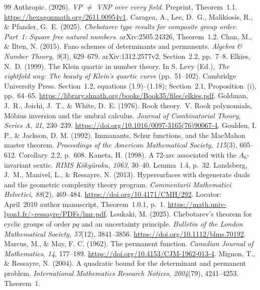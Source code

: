 \documentclass[11pt]{article}
\theoremstyle{definition}
\theoremstyle{remark}
\begin{document}
\begin{thebibliography}{99}
 Anthropic. (2026). \emph{VP $\ne$ VNP over every field}. Preprint, Theorem~1.1. \url{https://hexagonmath.org/2611.00954v1}.
 Caragea, A., Lee, D.~G., Malikiosis, R., \& Pfander, G.~E. (2025). \emph{Chebotarev type results for composite group order. Part~1: Square free natural numbers}. arXiv:2505.24326, Theorem~1.2.
 Chan, M., \& Ilten, N. (2015). Fano schemes of determinants and permanents. \emph{Algebra \& Number Theory, 9}(3), 629--679. arXiv:1312.2577v2, Section~2.2, pp.~7--8.
 Elkies, N.~D. (1999). The Klein quartic in number theory. In S. Levy (Ed.), \emph{The eightfold way: The beauty of Klein's quartic curve} (pp.~51--102). Cambridge University Press. Section~1.2, equations (1.9)--(1.18); Section~2.1, Proposition~(i), pp.~64--65. \url{https://library.slmath.org/books/Book35/files/elkies.pdf}.
 Goldman, J.~R., Joichi, J.~T., \& White, D.~E. (1976). Rook theory.~V. Rook polynomials, M\"obius inversion and the umbral calculus. \emph{Journal of Combinatorial Theory, Series A, 21}, 230--239. \url{https://doi.org/10.1016/0097-3165(76)90067-4}.
 Goulden, I. P., \& Jackson, D. M. (1992). Immanants, Schur functions, and the MacMahon master theorem. \emph{Proceedings of the American Mathematical Society, 115}(3), 605--612. Corollary~2.2, p.~608.
 Kaneta, H. (1998). A 72-arc associated with the $A_6$-invariant sextic. \emph{RIMS K\^oky\^uroku, 1063}, 30--40. Lemma~1.4, p.~32.
 Landsberg, J.~M., Manivel, L., \& Ressayre, N. (2013). Hypersurfaces with degenerate duals and the geometric complexity theory program. \emph{Commentarii Mathematici Helvetici, 88}(2), 469--484. \url{https://doi.org/10.4171/CMH/292}. Locator: April~2010 author manuscript, Theorem~1.0.1, p.~1. \url{https://math.univ-lyon1.fr/~ressayre/PDFs/lmr.pdf}.
 Loukaki, M. (2025). Chebotarev's theorem for cyclic groups of order $pq$ and an uncertainty principle. \emph{Bulletin of the London Mathematical Society, 57}(12), 3841--3856. \url{https://doi.org/10.1112/blms.70192}.
 Marcus, M., \& May, F. C. (1962). The permanent function. \emph{Canadian Journal of Mathematics, 14}, 177--189. \url{https://doi.org/10.4153/CJM-1962-013-4}.
 Mignon, T., \& Ressayre, N. (2004). A quadratic bound for the determinant and permanent problem. \emph{International Mathematics Research Notices, 2004}(79), 4241--4253. Theorem~1.

\end{thebibliography}
\end{document}
